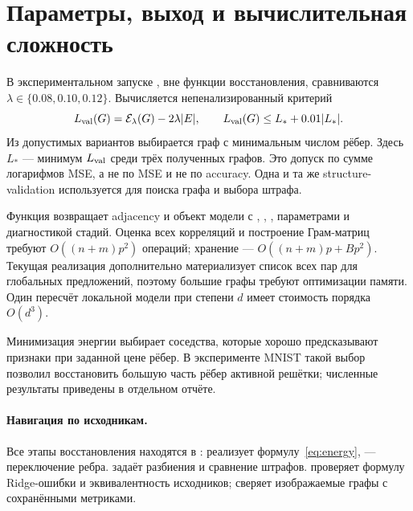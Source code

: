\documentclass[11pt,a4paper]{article}
\begin{document}
\section{Параметры, выход и вычислительная сложность}
В экспериментальном запуске , вне функции восстановления,
сравниваются $\lambda\in\{0.08,0.10,0.12\}$. Вычисляется непенализированный критерий
\begin{equation}
 L_{\rm val}(G)=\mathcal{E}_\lambda(G)-2\lambda|E|,\qquad
 L_{\rm val}(G)\le L_*+0.01|L_*|.
\end{equation}
Из допустимых вариантов выбирается граф с минимальным числом рёбер.
Здесь $L_*$ --- минимум $L_{\rm val}$ среди трёх полученных графов.
Это допуск по сумме логарифмов MSE, а не по MSE и не по accuracy.
Одна и та же structure-validation используется для поиска графа и выбора штрафа.

Функция возвращает adjacency и объект модели с , ,
, параметрами и диагностикой стадий.
Оценка всех корреляций и построение Грам-матриц требуют
$O((n+m)p^2)$ операций; хранение --- $O((n+m)p+Bp^2)$.
Текущая реализация дополнительно материализует список всех пар для глобальных предложений,
поэтому большие графы требуют оптимизации памяти. Один пересчёт локальной модели
при степени $d$ имеет стоимость порядка $O(d^3)$.

Минимизация энергии выбирает соседства, которые хорошо предсказывают признаки
при заданной цене рёбер. В эксперименте MNIST такой выбор позволил восстановить
большую часть рёбер активной решётки; численные результаты приведены в отдельном отчёте.

\paragraph{Навигация по исходникам.}
Все этапы восстановления находятся в :
 реализует формулу~\eqref{eq:energy},  --- переключение ребра.
 задаёт разбиения и сравнение штрафов.
 проверяет формулу Ridge-ошибки и эквивалентность исходников;
 сверяет изображаемые графы с сохранёнными метриками.
\end{document}
